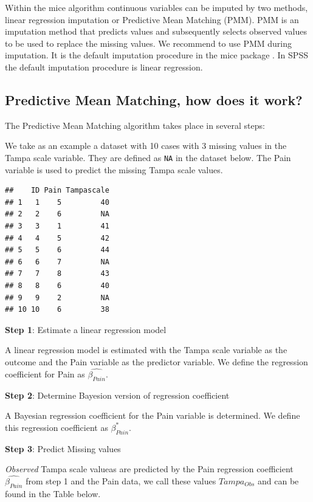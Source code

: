 \documentclass[
]{book}
\begin{document}
Within the mice algorithm continuous variables can be imputed by two methods, linear regression imputation or Predictive Mean Matching (PMM). PMM is an imputation method that predicts values and subsequently selects observed values to be used to replace the missing values. We recommend to use PMM during imputation. It is the default imputation procedure in the mice package \citep{Rubin1987}. In SPSS the default imputation procedure is linear regression.

\hypertarget{predictive-mean-matching-how-does-it-work}{%
\subsection{Predictive Mean Matching, how does it work?}\label{predictive-mean-matching-how-does-it-work}}

The Predictive Mean Matching algorithm takes place in several steps:

We take as an example a dataset with 10 cases with 3 missing values in the Tampa scale variable. They are defined as \texttt{NA} in the dataset below. The Pain variable is used to predict the missing Tampa scale values.

\begin{verbatim}
##    ID Pain Tampascale
## 1   1    5         40
## 2   2    6         NA
## 3   3    1         41
## 4   4    5         42
## 5   5    6         44
## 6   6    7         NA
## 7   7    8         43
## 8   8    6         40
## 9   9    2         NA
## 10 10    6         38
\end{verbatim}

\textbf{Step 1}: Estimate a linear regression model

A linear regression model is estimated with the Tampa scale variable as the outcome and the Pain variable as the predictor variable. We define the regression coefficient for Pain as \(\hat{\beta_{Pain}}\).

\textbf{Step 2}: Determine Bayesion version of regression coefficient

A Bayesian regression coefficient for the Pain variable is determined. We define this regression coefficient as \(\beta_{Pain}^*\).

\textbf{Step 3}: Predict Missing values

\emph{Observed} Tampa scale valueas are predicted by the Pain regression coefficient \(\hat{\beta_{Pain}}\) from step 1 and the Pain data, we call these values \(Tampa_{Obs}\) and can be found in the Table below.
\end{document}
